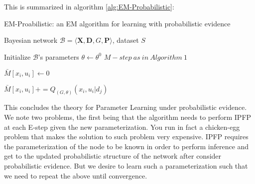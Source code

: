 \documentclass[11pt]{article}
\begin{document}
\begin{article}
This is summarized in algorithm \ref{alg:EM-Probabilistic}:

\algrenewcommand\algorithmicindent{1.5em}%

\begin{algorithm*}[h!]
\caption{EM-Proabilistic: an EM algorithm for learning with probabilistic evidence}
\label{alg:EM-Probabilistic}
\vspace{-10pt}
\begin{multicols}{2}
\begin{algorithmic}[1] 
\Require Bayesian network $\mathcal{B}=\langle \mathbf{X},\mathbf{D}, G, \mathbf{P} \rangle$, dataset $S$ 

\State Initialize $\mathcal{B}$'s parameters $\theta \leftarrow \theta^0$
  \State $M-step \ as \ in \ Algorithm \ 1$
\EndFor
\\


   \State $\bar{M}[x_{i},u_{i}]\leftarrow 0$
  \EndFor
\EndFor




        \State $\bar{M}[x_{i},u_{i}] \mathrel{{+}{=}} Q_{(G,\theta)}(x_{i},u_{i}|d_{j})$ 
      \EndFor
    \EndFor
\EndFor
\EndProcedure

\end{algorithmic}
\end{multicols}
\end{algorithm*}

This concludes the theory for Parameter Learning under
probabilistic evidence. We note two problems, the first being that
the algorithm needs to perform IPFP at each E-step given the new
parameterization. You run in fact a chicken-egg problem that makes
the solution to such problem very expensive. IPFP requires the
parameterization of the node to be known in order to perform
inference and get to the updated probabilistic structure of the
network after consider probabilistic evidence. But we desire to
learn such a parameterization such that we need to repeat the above
until convergence.


\end{article}
\end{document}
